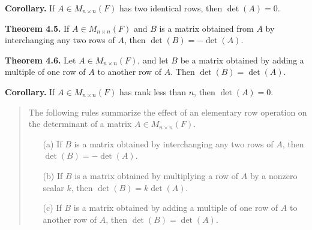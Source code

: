 \documentclass{article}
\newcommand{\0}{\mathit{0}}
\begin{document}
\medskip

\textbf{Corollary.} If $A \in M_{n \times n}(F)$ has two identical rows, then
$\det(A) = 0$.

\medskip

\textbf{Theorem 4.5.} If $A \in M_{n \times n}(F)$ and $B$ is a matrix obtained
from $A$ by interchanging any two rows of $A$, then $\det(B) = -\det(A)$.

\medskip

\textbf{Theorem 4.6.} Let $A \in M_{n \times n}(F)$, and let $B$ be a matrix
obtained by adding a multiple of one row of $A$ to another row of $A$.
Then $\det(B) = \det(A)$.

\medskip

\textbf{Corollary.} If $A \in M_{n \times n}(F)$ has rank less than $n$, then
$\det(A) = 0$.

\medskip

\begin{quotation}
    The following rules summarize the effect of an elementary row operation
    on the determinant of a matrix $A \in M_{n \times n}(F)$.
    \begin{itemize}
        \item[(a)] If $B$ is a matrix obtained by interchanging any two rows of $A$,
              then $\det(B) = -\det(A)$.
        \item[(b)] If $B$ is a matrix obtained by multiplying a row of $A$ by a
              nonzero scalar $k$, then $\det(B) = k \det(A)$.
        \item[(c)] If $B$ is a matrix obtained by adding a multiple of one row of $A$
              to another row of $A$, then $\det(B) = \det(A)$.
    \end{itemize}
\end{quotation}
\end{document}
